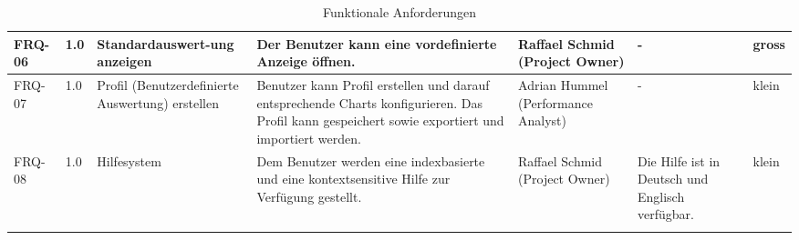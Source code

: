 \begin{landscape}
\begin{longtable}{|p{1.6cm}|p{0.7cm}|p{2.5cm}|p{4.5cm}|p{2.6cm}|p{4cm}|p{0.9cm}|}
   FRQ-06 & 1.0 & Standardauswert-ung anzeigen & Der Benutzer kann eine vordefinierte Anzeige öffnen. & Raffael Schmid (Project Owner) & - & gross \\\hline

   FRQ-07 & 1.0 & Profil (Benutzerdefinierte Auswertung) erstellen & Benutzer kann Profil erstellen und darauf entsprechende Charts konfigurieren. Das Profil kann gespeichert sowie exportiert und importiert werden.& Adrian Hummel (Performance Analyst) & - & klein \\\hline

  FRQ-08 & 1.0 & Hilfesystem &  Dem Benutzer werden eine indexbasierte und eine kontextsensitive Hilfe zur Verfügung gestellt. & Raffael Schmid (Project Owner) & Die Hilfe ist in Deutsch und Englisch verfügbar. & klein \\\hline
\caption{Funktionale Anforderungen}
\end{longtable}
\end{landscape}

